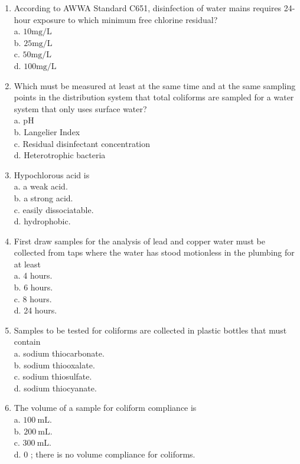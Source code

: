 \documentclass[10pt]{article}
\begin{document}
\begin{enumerate}
  \item According to AWWA Standard C651, disinfection of water mains requires 24-hour exposure to which minimum free chlorine residual?\\
a. $10 \mathrm{mg} / \mathrm{L}$\\
b. $25 \mathrm{mg} / \mathrm{L}$\\
c. $50 \mathrm{mg} / \mathrm{L}$\\
d. $100 \mathrm{mg} / \mathrm{L}$

  \item Which must be measured at least at the same time and at the same sampling points in the distribution system that total coliforms are sampled for a water system that only uses surface water?\\
a. $\mathrm{pH}$\\
b. Langelier Index\\
c. Residual disinfectant concentration\\
d. Heterotrophic bacteria 

\item Hypochlorous acid is\\
a. a weak acid.\\
b. a strong acid.\\
c. easily dissociatable.\\
d. hydrophobic.

  \item First draw samples for the analysis of lead and copper water must be collected from taps where the water has stood motionless in the plumbing for at least\\
a. 4 hours.\\
b. 6 hours.\\
c. 8 hours.\\
d. 24 hours.

  \item Samples to be tested for coliforms are collected in plastic bottles that must contain\\
a. sodium thiocarbonate.\\
b. sodium thiooxalate.\\
c. sodium thiosulfate.\\
d. sodium thiocyanate.

  \item The volume of a sample for coliform compliance is\\
a. $100 \mathrm{~mL}$.\\
b. $200 \mathrm{~mL}$.\\
c. $300 \mathrm{~mL}$.\\
d. 0 ; there is no volume compliance for coliforms.


\end{enumerate}
\end{document}
